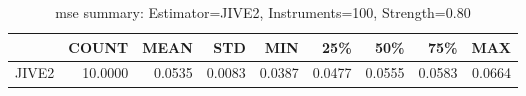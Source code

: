 \begin{table}[ht]
\centering
\caption{mse summary: Estimator=JIVE2, Instruments=100, Strength=0.80}
\begin{tabular}{lrrrrrrrr}
\toprule
 & COUNT & MEAN & STD & MIN & 25\% & 50\% & 75\% & MAX \\
\midrule
JIVE2 & 10.0000 & 0.0535 & 0.0083 & 0.0387 & 0.0477 & 0.0555 & 0.0583 & 0.0664 \\
\bottomrule
\end{tabular}
\end{table}
